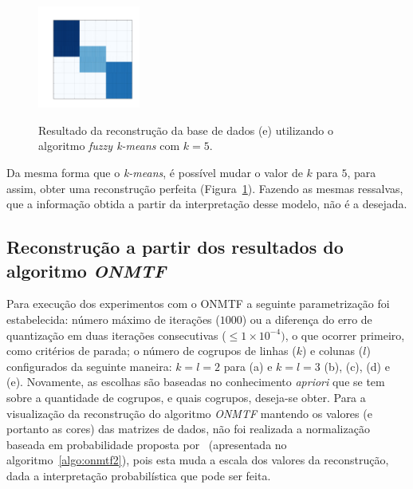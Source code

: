 \documentclass[
    12pt,                %
    oneside,            %
    a4paper,            %
    english,            %
    brazil                %
    ]{abntex2ppgsi}
\begin{document}


\begin{figure}[H]
\centering
    \caption{Resultado da reconstrução da base de dados (e) utilizando o algoritmo \textit{fuzzy k-means} com $k = 5$.}
    \includegraphics[width=0.3\textwidth]{img/e-reconstruction-2-fkmeans.png}
    \label{fig:reconstruction-2:fkmeans}
\end{figure}

Da mesma forma que o \textit{k-means}, é possível mudar o valor de $k$ para $5$, para assim, obter uma reconstrução perfeita (Figura~\ref{fig:reconstruction-2:fkmeans}).
Fazendo as mesmas ressalvas, que a informação obtida a partir da interpretação desse modelo, não é a desejada.

\subsection{Reconstrução a partir dos resultados do algoritmo \textit{ONMTF}}
\label{subsec:results-reconstruction-onmtf}

Para execução dos experimentos com o ONMTF a seguinte parametrização foi estabelecida: número máximo de iterações ($1000$) ou a diferença do erro de quantização em duas iterações consecutivas ($\leq 1 \times 10^{-4})$, o que ocorrer primeiro, como critérios de parada; o número de cogrupos de linhas ($k$) e colunas ($l$) configurados da seguinte maneira: $k = l = 2$ para (a) e $k = l = 3$ (b), (c), (d) e (e).
Novamente, as escolhas são baseadas no conhecimento \textit{apriori} que se tem sobre a quantidade de cogrupos, e quais cogrupos, deseja-se obter.
Para a visualização da reconstrução do algoritmo \textit{ONMTF} mantendo os valores (e portanto as cores) das matrizes de dados, não foi realizada a normalização baseada em probabilidade proposta por~ (apresentada no algoritmo~\ref{algo:onmtf2}), pois esta muda a escala dos valores da reconstrução, dada a interpretação probabilística que pode ser feita.
\end{document}
